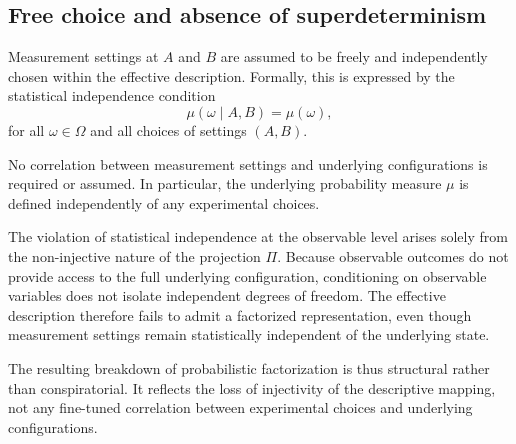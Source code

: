 \subsection{Free choice and absence of superdeterminism}
  \label{subsec:free-choice-and-absence-of-superdeterminism}

  Measurement settings at $A$ and $B$ are assumed to be freely and independently
  chosen within the effective description.
  Formally, this is expressed by the statistical independence condition
  \[
    \mu(\omega \mid A,B) = \mu(\omega),
  \]
  for all $\omega \in \Omega$ and all choices of settings $(A,B)$.

  No correlation between measurement settings and underlying configurations is
  required or assumed.
  In particular, the underlying probability measure $\mu$ is defined independently
  of any experimental choices.

  The violation of statistical independence at the observable level arises solely
  from the non-injective nature of the projection $\Pi$.
  Because observable outcomes do not provide access to the full underlying
  configuration, conditioning on observable variables does not isolate independent
  degrees of freedom.
  The effective description therefore fails to admit a factorized representation,
  even though measurement settings remain statistically independent of the
  underlying state.

  The resulting breakdown of probabilistic factorization is thus structural rather
  than conspiratorial.
  It reflects the loss of injectivity of the descriptive mapping, not any
  fine-tuned correlation between experimental choices and underlying configurations.
